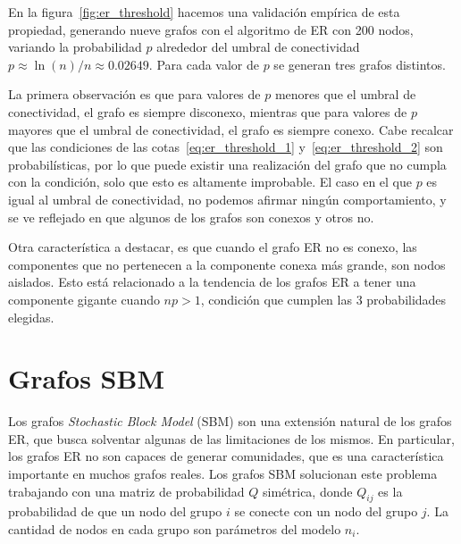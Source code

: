 \documentclass{article}
\begin{document}
En la figura~\ref{fig:er_threshold} hacemos una validación empírica de esta propiedad, generando nueve grafos
con el algoritmo de ER con 200 nodos, variando la probabilidad $p$ alrededor del umbral de conectividad $p \approx \ln(n)/n \approx 0.02649$. Para cada valor de $p$ se generan tres grafos distintos.

La primera observación es que para valores de $p$ menores que el umbral de conectividad, el grafo es siempre disconexo, mientras que para valores de $p$ mayores que el umbral de conectividad, el grafo es siempre conexo. Cabe recalcar que las condiciones de las cotas~\eqref{eq:er_threshold_1} y~\eqref{eq:er_threshold_2} son probabilísticas, por lo que puede existir una realización del grafo que no cumpla con la condición, solo
que esto es altamente improbable. El caso en el que $p$ es igual al umbral de conectividad, no podemos afirmar ningún comportamiento, y se ve reflejado en que algunos de los grafos son conexos y otros no. 

Otra característica a destacar, es que cuando el grafo ER no es conexo, las componentes que no pertenecen
a la componente conexa más grande, son nodos aislados. Esto está relacionado a la tendencia de los grafos ER
a tener una componente gigante cuando $np>1$, condición que cumplen las 3 probabilidades elegidas.

\section{Grafos SBM}
\label{sec:grafos_sbm}

Los grafos \emph{Stochastic Block Model} (SBM) son una extensión natural de los grafos ER, que busca solventar algunas de las limitaciones de los mismos. En particular,
los grafos ER no son capaces de generar comunidades, que es una característica importante en muchos grafos reales. Los grafos SBM solucionan este problema trabajando
con una matriz de probabilidad $Q$ simétrica, donde $Q_{ij}$ es la probabilidad de que un nodo del grupo $i$ se conecte con un nodo del grupo $j$. La cantidad de nodos 
en cada grupo son parámetros del modelo $n_i$.
\end{document}
